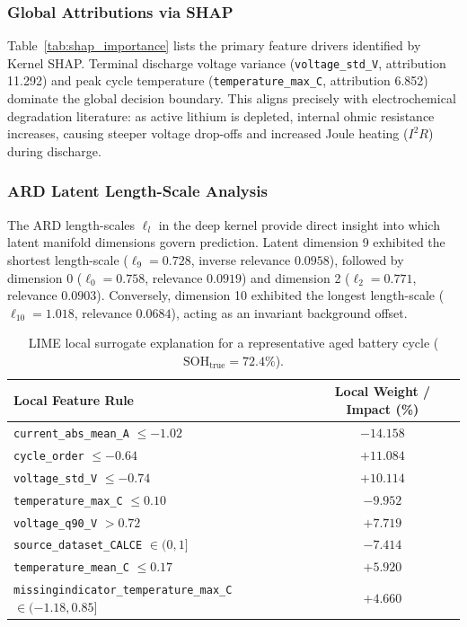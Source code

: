\documentclass[a4paper,fleqn]{cas-sc}
\begin{document}
\subsubsection{Global Attributions via SHAP}
Table~\ref{tab:shap_importance} lists the primary feature drivers identified by Kernel SHAP. Terminal discharge voltage variance (\texttt{voltage\_std\_V}, attribution 11.292) and peak cycle temperature (\texttt{temperature\_max\_C}, attribution 6.852) dominate the global decision boundary. This aligns precisely with electrochemical degradation literature: as active lithium is depleted, internal ohmic resistance increases, causing steeper voltage drop-offs and increased Joule heating ($I^2 R$) during discharge.

\subsubsection{ARD Latent Length-Scale Analysis}
The ARD length-scales $\ell_l$ in the deep kernel provide direct insight into which latent manifold dimensions govern prediction. Latent dimension 9 exhibited the shortest length-scale ($\ell_9 = 0.728$, inverse relevance $0.0958$), followed by dimension 0 ($\ell_0 = 0.758$, relevance $0.0919$) and dimension 2 ($\ell_2 = 0.771$, relevance $0.0903$). Conversely, dimension 10 exhibited the longest length-scale ($\ell_{10} = 1.018$, relevance $0.0684$), acting as an invariant background offset.

\begin{table}[htbp]
\centering
\caption{LIME local surrogate explanation for a representative aged battery cycle ($\text{SOH}_{\text{true}} = 72.4\%$).}
\label{tab:lime_explanation}
\footnotesize
\renewcommand{\arraystretch}{1.15}
\begin{tabular*}{\linewidth}{@{\extracolsep{\fill}}lc@{}}
\toprule
\textbf{Local Feature Rule} & \textbf{Local Weight / Impact (\%)} \\
\midrule
\texttt{current\_abs\_mean\_A} $\le -1.02$ & $-14.158$ \\
\texttt{cycle\_order} $\le -0.64$ & $+11.084$ \\
\texttt{voltage\_std\_V} $\le -0.74$ & $+10.114$ \\
\texttt{temperature\_max\_C} $\le 0.10$ & $-9.952$ \\
\texttt{voltage\_q90\_V} $> 0.72$ & $+7.719$ \\
\texttt{source\_dataset\_CALCE} $\in (0, 1]$ & $-7.414$ \\
\texttt{temperature\_mean\_C} $\le 0.17$ & $+5.920$ \\
\texttt{missingindicator\_temperature\_max\_C} $\in (-1.18, 0.85]$ & $+4.660$ \\
\bottomrule
\end{tabular*}
\end{table}
\end{document}

